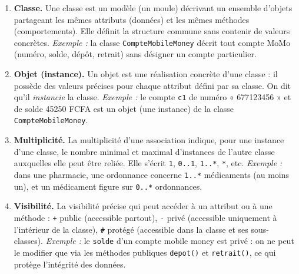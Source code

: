 \documentclass[11pt]{article}
\begin{document}
\begin{corrige}
\begin{enumerate}
  \item \textbf{Classe.} Une classe est un modèle (un moule) décrivant un ensemble d'objets partageant les mêmes attributs (données) et les mêmes méthodes (comportements). Elle définit la structure commune sans contenir de valeurs concrètes. \emph{Exemple :} la classe \texttt{CompteMobileMoney} décrit tout compte MoMo (numéro, solde, dépôt, retrait) sans désigner un compte particulier.
  \item \textbf{Objet (instance).} Un objet est une réalisation concrète d'une classe : il possède des valeurs précises pour chaque attribut défini par sa classe. On dit qu'il \emph{instancie} la classe. \emph{Exemple :} le compte \texttt{c1} de numéro « 677123456 » et de solde \num{45250} FCFA est un objet (une instance) de la classe \texttt{CompteMobileMoney}.
  \item \textbf{Multiplicité.} La multiplicité d'une association indique, pour une instance d'une classe, le nombre minimal et maximal d'instances de l'autre classe auxquelles elle peut être reliée. Elle s'écrit \texttt{1}, \texttt{0..1}, \texttt{1..*}, \texttt{*}, etc. \emph{Exemple :} dans une pharmacie, une ordonnance concerne \texttt{1..*} médicaments (au moins un), et un médicament figure sur \texttt{0..*} ordonnances.
  \item \textbf{Visibilité.} La visibilité précise qui peut accéder à un attribut ou à une méthode : \texttt{+} public (accessible partout), \texttt{-} privé (accessible uniquement à l'intérieur de la classe), \texttt{\#} protégé (accessible dans la classe et ses sous-classes). \emph{Exemple :} le \texttt{solde} d'un compte mobile money est privé : on ne peut le modifier que via les méthodes publiques \texttt{depot()} et \texttt{retrait()}, ce qui protège l'intégrité des données.
\end{enumerate}
\end{corrige}
\end{document}
